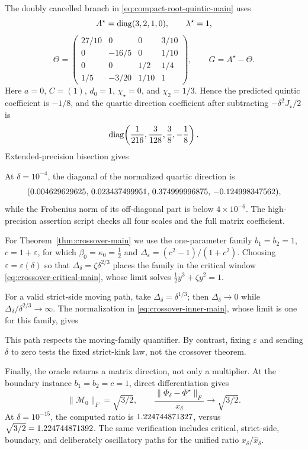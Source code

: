 The doubly cancelled branch in
\eqref{eq:compact-root-quintic-main} uses
\[
 A^\star=\operatorname{diag}(3,2,1,0),\qquad \lambda^\star=1,
\]
\[
 \Theta=\begin{pmatrix}
  27/10&0&0&3/10\\
  0&-16/5&0&1/10\\
  0&0&1/2&1/4\\
  1/5&-3/20&1/10&1
 \end{pmatrix},\qquad G=A^\star-\Theta.
\]
Here \(a=0\), \(C=(1)\), \(d_0=1\),
\(\chi_\star=0\), and \(\chi_2=1/3\).  Hence the predicted quintic
coefficient is \(-1/8\), and the quartic direction coefficient after
subtracting \(-\delta^2J_\star/2\) is
\[
 \operatorname{diag}\!\left(\frac1{216},\frac3{128},\frac38,-\frac18\right).
\]
Extended-precision bisection gives

At \(\delta=10^{-4}\), the diagonal of the normalized quartic direction is
\[
 (0.004629629625,\,0.023437499951,\,0.374999996875,\,-0.124998347562),
\]
while the Frobenius norm of its off-diagonal part is below
\(4\times10^{-6}\).  The high-precision assertion script checks all four
scales and the full matrix coefficient.

For Theorem~\ref{thm:crossover-main} we use the one-parameter family
\(b_1=b_2=1\), \(c=1+\varepsilon\), for which
\(\beta_0=\kappa_0=\tfrac12\) and
\(\Delta_\varepsilon=(c^2-1)/(1+c^2)\).  Choosing \(\varepsilon=
\varepsilon(\delta)\) so that \(\Delta_\delta=\zeta\delta^{2/3}\) places the
family in the critical window \eqref{eq:crossover-critical-main}, whose
limit solves \(\tfrac12y^3+\zeta y^2=1\).



For a valid strict-side moving path, take
\(\Delta_\delta=\delta^{1/3}\); then
\(\Delta_\delta\to0\) while
\(\Delta_\delta/\delta^{2/3}\to\infty\).  The normalization in
\eqref{eq:crossover-inner-main}, whose limit is one for this family, gives

This path respects the moving-family quantifier.  By contrast, fixing
\(\varepsilon\) and sending \(\delta\) to zero tests the fixed strict-kink
law, not the crossover theorem.

Finally, the oracle returns a matrix direction, not only a multiplier.  At
the boundary instance \(b_1=b_2=c=1\), direct differentiation gives
\[
 \|\mathcal M_0\|_F=\sqrt{3/2},
 \qquad
 \frac{\|\Phi_\delta-\Phi^\star\|_F}{x_\delta}
 \longrightarrow\sqrt{3/2}.
\]
At \(\delta=10^{-15}\), the computed ratio is
\(1.224744871327\), versus
\(\sqrt{3/2}=1.224744871392\).  The same verification includes critical,
strict-side, boundary, and deliberately oscillatory paths for the unified
ratio \(x_\delta/\widehat x_\delta\).

